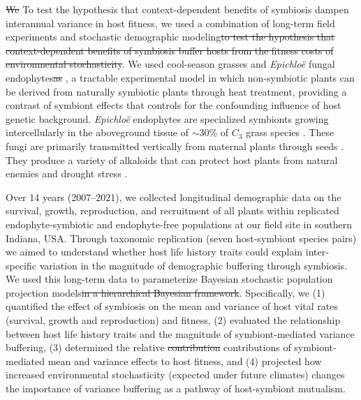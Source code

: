 \documentclass[lineno,sn-nature]{sn-jnl}%
\providecommand{\DIFadd}[1]{{\protect\color{blue}#1}} %
\providecommand{\DIFdel}[1]{{\protect\color{red}\protect\scriptsize\sout{#1}}}
\providecommand{\DIFadd}[1]{{\protect\color{blue}\uwave{#1}}} %
\providecommand{\DIFdel}[1]{{\protect\color{red}\sout{#1}}}                      %
\providecommand{\DIFaddbegin}{} %
\providecommand{\DIFaddend}{} %
\providecommand{\DIFdelbegin}{} %
\providecommand{\DIFdelend}{} %
\newcommand{\DIFscaledelfig}{0.5}
\newlength{\DIFdelgraphicswidth} %
\newlength{\DIFdelgraphicsheight} %
\newcommand{\DIFaddincludegraphics}[2][]{{\color{blue}\fbox{\DIFOincludegraphics[#1]{#2}}}} %
\newcommand{\DIFdelincludegraphics}[2][]{%
\sbox{\DIFdelgraphicsbox}{\DIFOincludegraphics[#1]{#2}}%
\settoboxwidth{\DIFdelgraphicswidth}{\DIFdelgraphicsbox} %
\settoboxtotalheight{\DIFdelgraphicsheight}{\DIFdelgraphicsbox} %
\scalebox{\DIFscaledelfig}{%
\parbox[b]{\DIFdelgraphicswidth}{\usebox{\DIFdelgraphicsbox}\\[-\baselineskip] \rule{\DIFdelgraphicswidth}{0em}}\llap{\resizebox{\DIFdelgraphicswidth}{\DIFdelgraphicsheight}{%
\setlength{\unitlength}{\DIFdelgraphicswidth}%
\begin{picture}(1,1)%
\thicklines\linethickness{2pt} %
{\color[rgb]{1,0,0}\put(0,0){\framebox(1,1){}}}%
{\color[rgb]{1,0,0}\put(0,0){\line( 1,1){1}}}%
{\color[rgb]{1,0,0}\put(0,1){\line(1,-1){1}}}%
\end{picture}%
}\hspace*{3pt}}} %
} %
\DeclareRobustCommand{\DIFaddbegin}{\DIFOaddbegin \let\includegraphics\DIFaddincludegraphics} %
\DeclareRobustCommand{\DIFaddend}{\DIFOaddend \let\includegraphics\DIFOincludegraphics} %
\DeclareRobustCommand{\DIFdelbegin}{\DIFOdelbegin \let\includegraphics\DIFdelincludegraphics} %
\DeclareRobustCommand{\DIFdelend}{\DIFOaddend \let\includegraphics\DIFOincludegraphics} %
\begin{document}
\DIFdelbegin \DIFdel{We }\DIFdelend \DIFaddbegin \DIFadd{To test the hypothesis that context-dependent benefits of symbiosis dampen interannual variance in host fitness, we }\DIFaddend used a combination of long-term field experiments and stochastic demographic modeling\DIFdelbegin \DIFdel{to test the hypothesis that context-dependent benefits of symbiosis buffer hosts from the fitness costs of environmental stochasticity}\DIFdelend .
We used cool-season grasses and \emph{Epichlo\"{e}} fungal endophytes\DIFdelbegin \DIFdel{as }\DIFdelend \DIFaddbegin \DIFadd{, }\DIFaddend a tractable experimental model in which non-symbiotic plants can be derived from naturally symbiotic plants through heat treatment, providing a contrast of symbiont effects that controls for the confounding influence of host genetic background. 
\emph{Epichlo\"{e}} endophytes are specialized symbionts growing intercellularly in the aboveground tissue of  $\sim30$\% of $C_{3}$ grass species \cite{leuchtmann1992systematics}.
These fungi are primarily transmitted vertically from maternal plants through seeds \cite{cheplick2009ecology}.
They produce a variety of alkaloids that can protect host plants from natural enemies \cite{brem2001epichloe} and drought stress \cite{decunta2021systematic}.

Over 14 years (2007--2021), we collected longitudinal demographic data on the survival, growth, reproduction, and recruitment of all plants within replicated endophyte-symbiotic and endophyte-free populations at our field site in southern Indiana, USA. 
Through taxonomic replication (seven host-symbiont species pairs) we aimed to understand whether host life history traits could explain inter-specific variation in the magnitude of demographic buffering through symbiosis. 
We used this long-term data to parameterize \DIFaddbegin \DIFadd{Bayesian }\DIFaddend stochastic population projection models\DIFdelbegin \DIFdel{in a hierarchical Bayesian framework}\DIFdelend . 
Specifically, we  (1) quantified the effect of symbiosis on the mean and variance of host vital rates (survival, growth and reproduction) and fitness, (2) evaluated the relationship between host life history traits and the magnitude of symbiont-mediated variance buffering, (3) determined the relative \DIFdelbegin \DIFdel{contribution }\DIFdelend \DIFaddbegin \DIFadd{contributions }\DIFaddend of symbiont-mediated mean and variance effects to host fitness, and (4) projected how increased environmental stochasticity (expected under future climates) changes the importance of variance buffering as a pathway of host-symbiont mutualism. 
\end{document}
